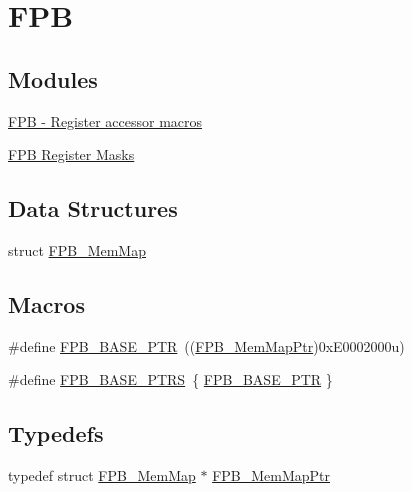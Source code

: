 \hypertarget{group___f_p_b___peripheral}{}\section{F\+P\+B}
\label{group___f_p_b___peripheral}
\subsection*{Modules}
\begin{DoxyCompactItemize}
\item 
\hyperlink{group___f_p_b___register___accessor___macros}{F\+P\+B -\/ Register accessor macros}
\item 
\hyperlink{group___f_p_b___register___masks}{F\+P\+B Register Masks}
\end{DoxyCompactItemize}
\subsection*{Data Structures}
\begin{DoxyCompactItemize}
\item 
struct \hyperlink{struct_f_p_b___mem_map}{F\+P\+B\+\_\+\+Mem\+Map}
\end{DoxyCompactItemize}
\subsection*{Macros}
\begin{DoxyCompactItemize}
\item 
\#define \hyperlink{group___f_p_b___peripheral_ga95d994c97f967ce02339465def6bac95}{F\+P\+B\+\_\+\+B\+A\+S\+E\+\_\+\+P\+T\+R}~((\hyperlink{group___f_p_b___peripheral_gaffb8b5a06bae98ff71e1337bfd371172}{F\+P\+B\+\_\+\+Mem\+Map\+Ptr})0x\+E0002000u)
\item 
\#define \hyperlink{group___f_p_b___peripheral_ga3073bbdd81158d27cf132d1df17fa83f}{F\+P\+B\+\_\+\+B\+A\+S\+E\+\_\+\+P\+T\+R\+S}~\{ \hyperlink{group___f_p_b___peripheral_ga95d994c97f967ce02339465def6bac95}{F\+P\+B\+\_\+\+B\+A\+S\+E\+\_\+\+P\+T\+R} \}
\end{DoxyCompactItemize}
\subsection*{Typedefs}
\begin{DoxyCompactItemize}
\item 
typedef struct \hyperlink{struct_f_p_b___mem_map}{F\+P\+B\+\_\+\+Mem\+Map} $\ast$ \hyperlink{group___f_p_b___peripheral_gaffb8b5a06bae98ff71e1337bfd371172}{F\+P\+B\+\_\+\+Mem\+Map\+Ptr}
\end{DoxyCompactItemize}


